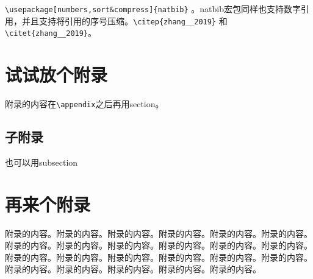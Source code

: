 \documentclass{ctexart}
\theoremstyle{plain} 		     %
\theoremstyle{definition} 		 %
\theoremstyle{remark} 			 %
\begin{document}
\verb|\usepackage[numbers,sort&compress]{natbib}| 。natbib宏包同样也支持数字引用，并且支持将引用的序号压缩。\verb|\citep{zhang__2019}| 和
\verb|\citet{zhang__2019}|。

\newpage
\nocite{*}				 %
\printbibliography   	 %

\newpage
\appendix				 %
\section{试试放个附录}
附录的内容在\verb|\appendix|之后再用section。

\subsection{子附录}
也可以用subsection

\section{再来个附录}
附录的内容。附录的内容。附录的内容。附录的内容。附录的内容。附录的内容。附录的内容。附录的内容。附录的内容。附录的内容。附录的内容。附录的内容。附录的内容。附录的内容。附录的内容。附录的内容。附录的内容。附录的内容。附录的内容。附录的内容。附录的内容。附录的内容。附录的内容。

\newpage
\listoffigures			 %
\listoftables			 %

\printindex				 %
\end{document}
